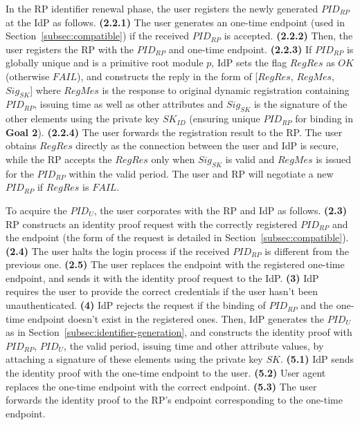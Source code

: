 In the RP identifier renewal phase, the user registers the newly generated $PID_{RP}$ at the IdP as follows. \textbf{(2.2.1)} The user generates an one-time endpoint (used in Section~\ref{subsec:compatible}) if the received $PID_{RP}$ is accepted. \textbf{(2.2.2)} Then, the user registers the RP with the $PID_{RP}$ and one-time endpoint. \textbf{(2.2.3)} If $PID_{RP}$ is globally unique and is a primitive root module $p$, IdP sets the flag $RegRes$ as $OK$ (otherwise $FAIL$), and constructs the reply in the form of
[$RegRes$, $RegMes$, $Sig_{SK}$]
where $RegMes$ is the response to original dynamic registration containing $PID_{RP}$, issuing time as well as other attributes and $Sig_{SK}$ is the signature of the other elements using the private key $SK_{ID}$ (ensuring unique $PID_{RP}$ for binding in \textbf{Goal 2}). \textbf{(2.2.4)} The user forwards the registration result to the RP. The user obtains $RegRes$ directly as the connection between the user and IdP is secure, while the RP accepts the $RegRes$ only when $Sig_{SK}$ is valid
and $RegMes$ is issued for the $PID_{RP}$ within the valid period. The user and RP will negotiate a new $PID_{RP}$ if $RegRes$ is $FAIL$.

To acquire the $PID_U$, the user corporates with the RP and IdP as follows. \textbf{(2.3)} RP constructs an identity proof request with the correctly registered $PID_{RP}$ and the endpoint (the form of the request is detailed in Section~\ref{subsec:compatible}). \textbf{(2.4)} The user halts the login process if the received $PID_{RP}$ is different from the previous one. \textbf{(2.5)} The user replaces the endpoint with the registered one-time endpoint, and sends it with the identity proof request to the IdP. \textbf{(3)} IdP requires the user to provide the correct credentials if the user hasn't been unauthenticated. \textbf{(4)} IdP rejects the request if the binding of $PID_{RP}$ and the one-time endpoint doesn't exist in the registered ones. Then, IdP generates the $PID_U$ as in Section~\ref{subsec:identifier-generation}, and constructs the identity proof with $PID_{RP}$, $PID_U$, the valid period, issuing time and other attribute values, by attaching a signature of these elements using the private key $SK$. \textbf{(5.1)} IdP sends the identity proof with the one-time endpoint to the user. \textbf{(5.2)} User agent replaces the one-time endpoint with the correct endpoint. \textbf{(5.3)} The user forwards the identity proof to the RP's endpoint corresponding to the one-time endpoint.

